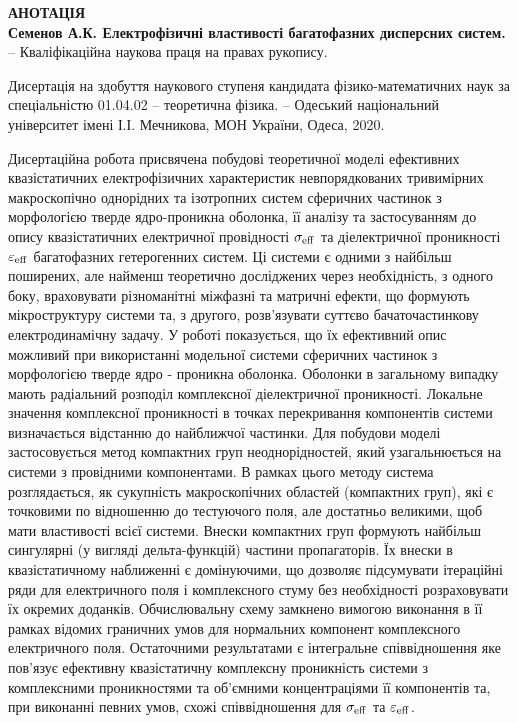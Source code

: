 \begin{center}
    {\normalfont \textbf{
    	АНОТАЦІЯ\\
    	Семенов А.К. Електрофізичні властивості багатофазних дисперсних систем.} -- Кваліфікаційна наукова праця на правах рукопису.}
\end{center}
\vskip 10pt

Дисертація на здобуття наукового ступеня кандидата фізико-матема\-тичних наук за спеціальністю 01.04.02 -- теоретична фізика. -- Одеський національний університет імені І.І. Мечникова, МОН України, Одеса, 2020.

\vskip 10pt

Дисертаційна робота присвячена побудові теоретичної моделі ефективних квазістатичних електрофізичних характеристик невпорядкованих тривимірних макроскопічно однорідних та ізотропних систем сферичних частинок з морфологією тверде ядро-проникна оболонка, її аналізу та застосуванням до опису квазістатичних електричної провідності $\sigma_{\rm eff}$ та діелектричної проникності $\varepsilon_{\rm eff}$ багатофазних гетерогенних систем. 
Ці системи є одними з найбільш поширених, але найменш теоретично досліджених через необхідність, з одного боку, враховувати різноманітні міжфазні та матричні ефекти, що формують мікроструктуру системи та, з другого, розв'язувати суттєво бачаточастинкову електродинамічну задачу.
У роботі показується, що їх ефективний опис можливий при використанні модельної системи сферичних частинок з морфологією тверде ядро - проникна оболонка. Оболонки в загальному випадку мають радіальний розподіл комплексної діелектричної проникності.
Локальне значення  комплексної проникності в точках перекривання компонентів системи визначається відстанню до найближчої частинки. 
Для побудови моделі застосовується метод компактних груп неоднорідностей, який узагальнюється на системи з провідними компонентами. В рамках цього методу система розглядається, як сукупність макроскопічних областей (компактних груп), які є точковими по відношенню до тестуючого поля, але достатньо великими, щоб мати властивості всієї системи. 
Внески компактних груп формують найбільш сингулярні (у вигляді дельта-функцій) частини пропагаторів. Їх внески в квазістатичному наближенні є домінуючими, що дозволяє підсумувати ітераційні ряди для електричного поля і комплексного стуму без необхідності розраховувати їх окремих доданків.
Обчислювальну схему замкнено вимогою виконання в її рамках відомих граничних умов для нормальних компонент комплексного електричного поля.
Остаточними результатами є інтегральне співвідношення яке пов'язує ефективну квазістатичну комплексну проникність системи з комплексними проникностями та об'ємними концентраціями її компонентів та, при виконанні певних умов, схожі співвідношення для $\sigma_{\rm eff}$ та $\varepsilon_{\rm eff}$.

